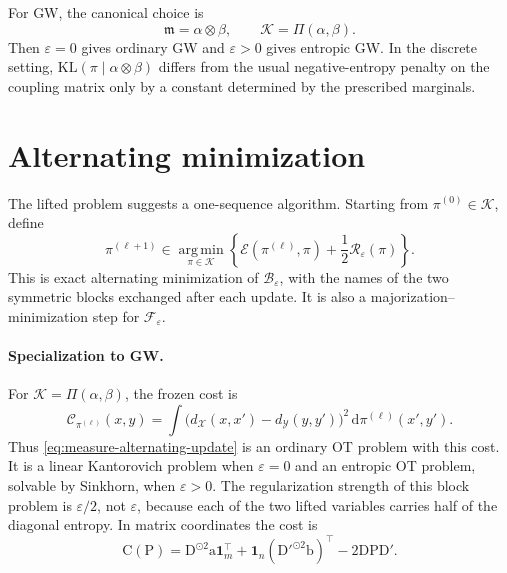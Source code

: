 \documentclass[11pt]{article}
\theoremstyle{definition}
\theoremstyle{remark}
\newcommand{\one}{\mathbf 1}
\newcommand{\Kcal}{\mathcal K}
\newcommand{\Pmat}{\mathrm P}
\newcommand{\Cmat}{\mathrm C}
\newcommand{\Dmat}{\mathrm D}
\newcommand{\Dmatp}{\mathrm D'}
\newcommand{\Ee}{\mathcal E}
\newcommand{\Fcal}{\mathcal F}
\newcommand{\Bcal}{\mathcal B}
\newcommand{\Rcal}{\mathcal R}
\newcommand{\Ccal}{\mathcal C}
\newcommand{\argmin}{\operatorname*{arg\,min}}
\newcommand{\dd}{\,\mathrm d}
\newcommand{\eps}{\varepsilon}
\newcommand{\KL}{\mathrm{KL}}
\begin{document}
For GW, the canonical choice is
\begin{equation}\label{eq:gw-reference-product}
  \mathfrak m=\alpha\otimes\beta,
  \qquad
  \Kcal=\Pi(\alpha,\beta).
\end{equation}
Then \(\eps=0\) gives ordinary GW and \(\eps>0\) gives entropic GW.  In the
discrete setting, \(\KL(\pi\mid\alpha\otimes\beta)\) differs from the usual
negative-entropy penalty on the coupling matrix only by a constant determined
by the prescribed marginals.

\section{Alternating minimization}
\label{sec:alternating}

The lifted problem suggests a one-sequence algorithm.  Starting from
\(\pi^{(0)}\in\Kcal\), define
\begin{equation}\label{eq:measure-alternating-update}
  \pi^{(\ell+1)}
  \in
  \argmin_{\pi\in\Kcal}
  \left\{
    \Ee(\pi^{(\ell)},\pi)
    +\frac12\Rcal_\eps(\pi)
  \right\}.
\end{equation}
This is exact alternating minimization of \(\Bcal_\eps\), with the names of
the two symmetric blocks exchanged after each update.  It is also a
majorization--minimization step for \(\Fcal_\eps\).

\paragraph{Specialization to GW.}
For \(\Kcal=\Pi(\alpha,\beta)\), the frozen cost is
\begin{equation}\label{eq:gw-frozen-measure-cost}
  \Ccal_{\pi^{(\ell)}}(x,y)
  =
  \int
  \bigl(d_{\mathcal X}(x,x')-d_{\mathcal Y}(y,y')\bigr)^2
  \dd\pi^{(\ell)}(x',y').
\end{equation}
Thus \eqref{eq:measure-alternating-update} is an ordinary OT problem with
this cost.  It is a linear Kantorovich problem when \(\eps=0\) and an
entropic OT problem, solvable by Sinkhorn, when \(\eps>0\).  The regularization
strength of this block problem is \(\eps/2\), not \(\eps\), because each of
the two lifted variables carries half of the diagonal entropy.  In matrix
coordinates the cost is
\begin{equation}\label{eq:discrete-frozen-gw-cost}
  \Cmat(\Pmat)
  =
  \Dmat^{\odot2}\mathrm a\one_m^\top
  +\one_n(\Dmatp^{\odot2}\mathrm b)^\top
  -2\Dmat\Pmat\Dmatp.
\end{equation}
\end{document}
